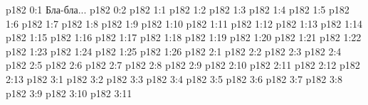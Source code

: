 \author{Промежуточные создания}
\vs p182 0:1  Бла-бла...
\vs p182 0:2 
\vs p182 1:1 
\vs p182 1:2 
\vs p182 1:3 
\vs p182 1:4 
\vs p182 1:5 
\vs p182 1:6 
\vs p182 1:7 
\vs p182 1:8 \pc 
\vs p182 1:9 
\vs p182 1:10 
\vs p182 1:11 
\vs p182 1:12 
\vs p182 1:13 
\vs p182 1:14 
\vs p182 1:15 
\vs p182 1:16 
\vs p182 1:17 
\vs p182 1:18 
\vs p182 1:19 
\vs p182 1:20 
\vs p182 1:21 
\vs p182 1:22 
\vs p182 1:23 
\vs p182 1:24 
\vs p182 1:25 
\vs p182 1:26 \pc 
{}
\vs p182 2:1 
\vs p182 2:2 
\vs p182 2:3 
\vs p182 2:4 
\vs p182 2:5 \pc 
\vs p182 2:6 
\vs p182 2:7 \pc 
\vs p182 2:8 
\vs p182 2:9 
\vs p182 2:10 \pc 
\vs p182 2:11 
\vs p182 2:12 \pc 
\vs p182 2:13 \pc 
{}
\vs p182 3:1 
\vs p182 3:2 
\vs p182 3:3 
\vs p182 3:4 
\vs p182 3:5 \pc 
\vs p182 3:6 
\vs p182 3:7 
\vs p182 3:8 
\vs p182 3:9 \pc 
\vs p182 3:10 
\vs p182 3:11 
\quizlink
